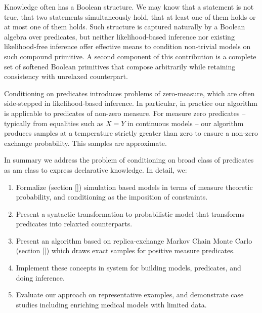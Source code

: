 Knowledge often has a Boolean structure.
We may know that a statement is not true, that two statements simultaneously hold, that at least one of them holds or at most one of them holds.
Such structure is captured naturally by a Boolean algebra over predicates, but neither likelihood-based inference nor existing likelihood-free inference offer effective means to condition non-trivial models on such compound primitive.
A second component of this contribution is a complete set of softened Boolean primitives that compose arbitrarily while retaining consistency with unrelaxed counterpart.

Conditioning on predicates introduces problems of zero-measure, which are often side-stepped in likelihood-based inference.
In particular, in practice our algorithm is applicable to predicates of non-zero measure.
For measure zero predicates -- typically from equalities such as $X = Y$ in continuous models -- our algorithm produces samples at a temperature strictly greater than zero to ensure a non-zero exchange probability.
This samples are approximate.


In summary we address the problem of conditioning on broad class of predicates as am class to express declarative knowledge.
In detail, we:

\begin{enumerate}
	\item Formalize (section \ref{}) simulation based models in terms of measure theoretic probability, and conditioning as the imposition of constraints.
	\item Present a syntactic transformation to probabilistic model that transforms predicates into relaxted counterparts. 
	\item Present an algorithm based on replica-exchange Markov Chain Monte Carlo (section \ref{}) which draws exact samples for positive measure predicates. 
	\item Implement these concepts in system for building models, predicates, and doing inference.
	\item Evaluate our approach on representative examples, and demonstrate case studies including enriching medical models with limited data.
\end{enumerate}


